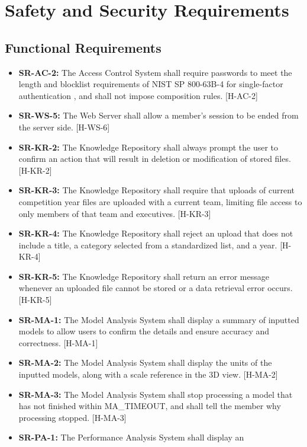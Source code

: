 \documentclass{article}
\begin{document}
\section{Safety and Security Requirements} \label{SecSafetyReqs}


\subsection{Functional Requirements}

\begin{itemize}
    \item \textbf{SR-AC-2:} The Access Control System shall require passwords to meet the length and
    blocklist requirements of NIST SP 800-63B-4 for single-factor authentication \cite{NIST80063B4},
    and shall not impose composition rules. [H-AC-2]
    \item \textbf{SR-WS-5:} The Web Server shall allow a member's session to be ended from the server side. [H-WS-6]
    \item \textbf{SR-KR-2:} The Knowledge Repository shall always prompt the user
    to confirm an action that will result in deletion or modification of stored files. [H-KR-2]
    \item \textbf{SR-KR-3:} The Knowledge Repository shall require that uploads of 
    current competition year files are uploaded with a current team, limiting file access 
    to only members of that team and executives. [H-KR-3]
    \item \textbf{SR-KR-4:} The Knowledge Repository shall reject an upload that
    does not include a title, a category selected from a standardized list, and a year. [H-KR-4]
    \item \textbf{SR-KR-5:} The Knowledge Repository shall return an error message 
    whenever an uploaded file cannot be stored or a data retrieval error occurs. [H-KR-5]
    \item \textbf{SR-MA-1:} The Model Analysis System shall display a summary of inputted models
    to allow users to confirm the details and ensure accuracy and correctness. [H-MA-1]
    \item \textbf{SR-MA-2:} The Model Analysis System shall display the units of the inputted models, 
    along with a scale reference in the 3D view. [H-MA-2]
    \item \textbf{SR-MA-3:} The Model Analysis System shall stop processing a
    model that has not finished within MA\_TIMEOUT, and shall tell the member why
    processing stopped. [H-MA-3]
    \item \textbf{SR-PA-1:} The Performance Analysis System shall display an

\end{itemize}
\end{document}
